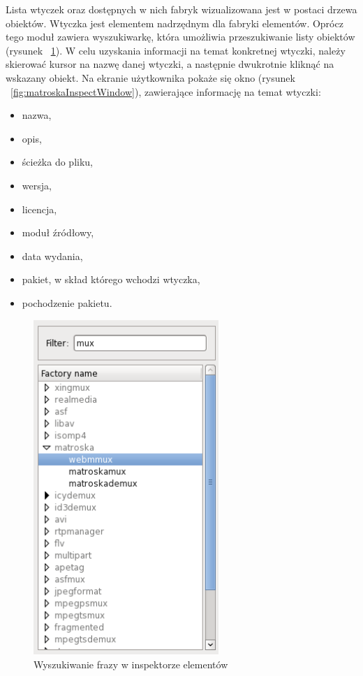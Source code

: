 \documentclass[12pt]{article}
\begin{document}
Lista wtyczek oraz dostępnych w nich fabryk wizualizowana jest w postaci drzewa obiektów. Wtyczka jest elementem nadrzędnym dla fabryki elementów. Oprócz tego moduł zawiera wyszukiwarkę, która umożliwia przeszukiwanie listy obiektów (rysunek ~\ref{fig:elementInspector}).
W celu uzyskania informacji na temat konkretnej wtyczki, należy skierować kursor na nazwę danej wtyczki, a następnie dwukrotnie kliknąć na wskazany obiekt. Na ekranie użytkownika pokaże się okno (rysunek ~\ref{fig:matroskaInspectWindow}), zawierające informację na temat wtyczki:
\begin{itemize}
  \setlength{\itemsep}{0em}
\item nazwa,
\item opis,
\item ścieżka do pliku,
\item wersja,
\item licencja,
\item moduł źródłowy,
\item data wydania,
\item pakiet, w skład którego wchodzi wtyczka,
\item pochodzenie pakietu.
\end{itemize}
\begin{figure}[H]
  \includegraphics[width=7cm]{img/element-inspector.png}
  \caption{Wyszukiwanie frazy w inspektorze elementów}
  \label{fig:elementInspector}
\end{figure}
\end{document}
